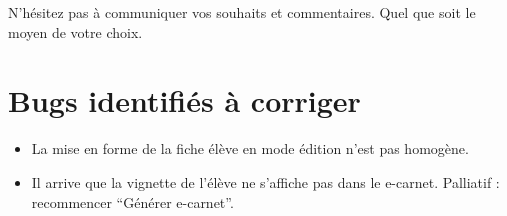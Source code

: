 \documentclass[oneside]{book}
\providecommand{\tightlist}{%
  \setlength{\itemsep}{0pt}\setlength{\parskip}{0pt}}
\begin{document}
N'hésitez pas à communiquer vos souhaits et commentaires. Quel que soit
le moyen de votre choix.

\hypertarget{bugs-identifiuxe9s-uxe0-corriger}{%
\section{Bugs identifiés à
corriger}\label{bugs-identifiuxe9s-uxe0-corriger}}

\begin{itemize}
\tightlist
\item
  La mise en forme de la fiche élève en mode édition n'est pas homogène.
\item
  Il arrive que la vignette de l'élève ne s'affiche pas dans le
  e-carnet. Palliatif : recommencer ``Générer e-carnet''.
\end{itemize}





\cleardoublepage
\setlength{\columnsep}{0.75cm}
\printindex{}
\end{document}
